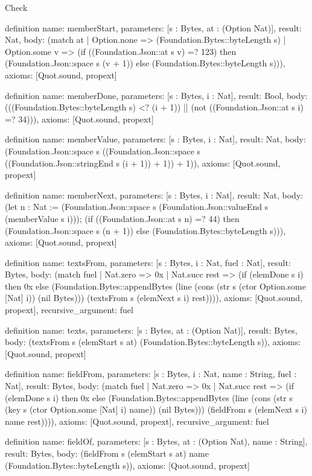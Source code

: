\begin{lexlean}{Check}
\begin{semanticmodule}
definition{
  name: memberStart,
  parameters: [s : Bytes, at : (Option Nat)],
  result: Nat,
  body: (match at
    | Option.none => (Foundation.Bytes::byteLength s)
    | Option.some v => (if ((Foundation.Json::at s v) =? 123) then (Foundation.Json::space s (v + 1)) else (Foundation.Bytes::byteLength s))),
  axioms: [Quot.sound, propext]
}

definition{
  name: memberDone,
  parameters: [s : Bytes, i : Nat],
  result: Bool,
  body: (((Foundation.Bytes::byteLength s) <? (i + 1)) || (not ((Foundation.Json::at s i) =? 34))),
  axioms: [Quot.sound, propext]
}

definition{
  name: memberValue,
  parameters: [s : Bytes, i : Nat],
  result: Nat,
  body: (Foundation.Json::space s ((Foundation.Json::space s ((Foundation.Json::stringEnd s (i + 1)) + 1)) + 1)),
  axioms: [Quot.sound, propext]
}

definition{
  name: memberNext,
  parameters: [s : Bytes, i : Nat],
  result: Nat,
  body: (let n : Nat := (Foundation.Json::space s (Foundation.Json::valueEnd s (memberValue s i))); (if ((Foundation.Json::at s n) =? 44) then (Foundation.Json::space s (n + 1)) else (Foundation.Bytes::byteLength s))),
  axioms: [Quot.sound, propext]
}

definition{
  name: textsFrom,
  parameters: [s : Bytes, i : Nat, fuel : Nat],
  result: Bytes,
  body: (match fuel
    | Nat.zero => 0x
    | Nat.succ rest => (if (elemDone s i) then 0x else (Foundation.Bytes::appendBytes (line (cons (str s (ctor Option.some [Nat] i)) (nil Bytes))) (textsFrom s (elemNext s i) rest)))),
  axioms: [Quot.sound, propext],
  recursive_argument: fuel
}

definition{
  name: texts,
  parameters: [s : Bytes, at : (Option Nat)],
  result: Bytes,
  body: (textsFrom s (elemStart s at) (Foundation.Bytes::byteLength s)),
  axioms: [Quot.sound, propext]
}

definition{
  name: fieldFrom,
  parameters: [s : Bytes, i : Nat, name : String, fuel : Nat],
  result: Bytes,
  body: (match fuel
    | Nat.zero => 0x
    | Nat.succ rest => (if (elemDone s i) then 0x else (Foundation.Bytes::appendBytes (line (cons (str s (key s (ctor Option.some [Nat] i) name)) (nil Bytes))) (fieldFrom s (elemNext s i) name rest)))),
  axioms: [Quot.sound, propext],
  recursive_argument: fuel
}

definition{
  name: fieldOf,
  parameters: [s : Bytes, at : (Option Nat), name : String],
  result: Bytes,
  body: (fieldFrom s (elemStart s at) name (Foundation.Bytes::byteLength s)),
  axioms: [Quot.sound, propext]
}


\end{semanticmodule}
\end{lexlean}
